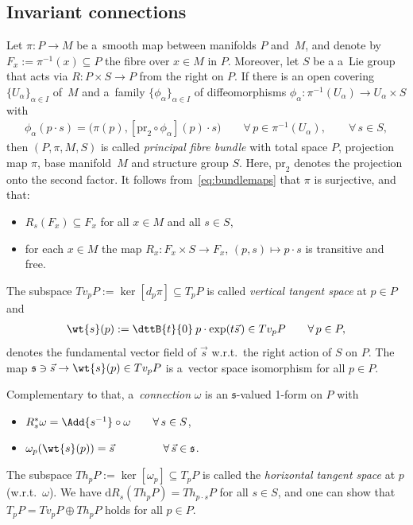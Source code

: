 \subsection{Invariant connections}\label{subsec:InvConn}

Let $\pi\colon P\rightarrow M$ be a~smooth map between manifolds $P$ and~$M$, and denote by
$F_x:=\pi^{-1}(x)\subseteq P$ the f\/ibre over $x\in M$ in $P$.
Moreover, let $S$ be a a~Lie group that acts via $R\colon P\times S\rightarrow P$ from the right on $P$.
If there is an open covering $\{U_\alpha\}_{\alpha\in I}$ of~$M$ and a~family $\{\phi_\alpha\}_{\alpha\in I}$ of
dif\/feomorphisms $\phi_\alpha\colon \pi^{-1}(U_\alpha)\rightarrow U_\alpha\times S$ with
\begin{gather}
\label{eq:bundlemaps}
\phi_\alpha(p\cdot s)=\big(\pi(p),[\mathrm{pr}_2\circ\phi_\alpha](p)\cdot s\big)
\qquad\forall\, p\in \pi^{-1}(U_\alpha),\qquad\forall\, s\in S,
\end{gather}
then $(P,\pi,M,S)$ is called \emph{principal fibre bundle} with total space $P$,
projection map $\pi$, base manifold~$M$ and structure group $S$.
Here, $\mathrm{pr}_2$
denotes the projection onto the second factor.
It follows from~\eqref{eq:bundlemaps} that $\pi$ is surjective, and that:
\begin{itemize}\itemsep=0pt
\item
$R_s(F_x)\subseteq F_x$ for all $x\in M$ and all $s\in S$,
\item
for each $x\in M$ the map $R_x\colon F_x \times S\rightarrow F_x$, $(p,s)\mapsto p\cdot s$ is transitive and free.
\end{itemize}
The subspace $Tv_pP:=\ker[d_p\pi]\subseteq T_pP$ is called \emph{vertical tangent
space} at $p\in P$ and
\begin{gather*}
\wt{s}(p):=\dttB{t}{0}\: p\cdot \exp(t\vec{s}\hspace{1pt})\in Tv_pP
\qquad\forall\, p\in P,
\end{gather*}
denotes the fundamental vector f\/ield of $\vec{s}$ w.r.t.~the right action of $S$ on
$P$.
The map $\mathfrak{s}\ni\vec{s}\rightarrow \wt{s}(p)\in Tv_pP$ is a~vector space isomorphism for all $p\in P$.

Complementary to that, a~\emph{connection} $\omega$ is an $\mathfrak{s}$-valued 1-form on $P$ with \begin{itemize}\itemsep=0pt
\item
$R_s^{*}\omega= \Add{s^{-1}}\circ \omega\qquad \forall\,s\in S$,
\item
$\omega_p(\wt{s}(p))=\vec{s}\hspace{44pt}\forall\,\vec{s}\in \mathfrak{s}$.
\end{itemize}
The subspace $Th_pP:=\ker[\omega_p]\subseteq T_pP$ is called the \emph{horizontal
tangent space} at $p$ (w.r.t.~$\omega$).
We have $\mathrm{d} R_s(Th_pP)=Th_{p\cdot s}P$ for all $s\in S$, and one can show that $T_pP= Tv_pP\oplus Th_pP$ holds for all
$p\in P$.


